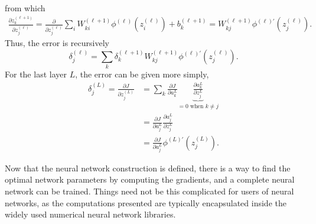 from which
\begin{align*}
    \frac{\partial z_{k}^{(\ell+1)}}{\partial z_{j}^{(\ell)}}  = \frac{\partial}{\partial z_{j}^{(\ell)}} \sum_{i} W_{ki}^{(\ell+1)} \phi^{(\ell)}(z_{i}^{(\ell)}) + b_{k}^{(\ell+1)} = W_{kj}^{(\ell+1)} \phi^{(\ell)\prime} (z_{j}^{(\ell)}).
\end{align*}
Thus, the error is recursively
\begin{equation*}
    \delta_{j}^{(\ell)} =  \sum_{k} \delta_{k}^{(\ell+1)} W_{kj}^{(\ell+1)} \phi^{(\ell)\prime} (z_{j}^{(\ell)}).
\end{equation*}
For the last layer $L$, the error can be given more simply,
\begin{align*}
    \delta_{j}^{(L)} = \frac{\partial J}{\partial z_{j}^{(L)}} &= \sum_{k} \frac{\partial J}{\partial a_{k}^{L}} \underbrace{\frac{\partial a_{k}^{L}}{\partial z_{j}^{L}}}_{=0\text{ when } k \neq j} \\
                                                                    &= \frac{\partial J}{\partial a_{j}^{L}} \frac{\partial a_{j}^{L}}{\partial z_{j}^{L}}\\
                                                                    &= \frac{\partial J}{\partial a_{j}^{L}} \phi^{(L)\prime} (z_{j}^{(L)}).
\end{align*}

Now that the neural network construction is defined, there is a way to find the optimal network parameters by computing the gradients, and a complete neural network can be trained.
Things need not be this complicated for users of neural networks, as the computations presented are typically encapsulated inside the widely used numerical neural network libraries. 
